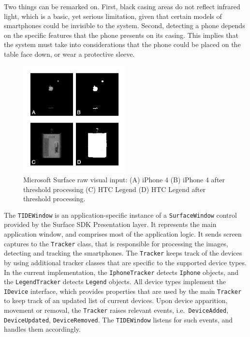 Two things can be remarked on.
First, black casing areas do not reflect infrared light, which is a basic, yet serious limitation, given that certain models of smartphones could be invisible to the system.
Second, detecting a phone depends on the specific features that the phone presents on its casing.
This implies that the system must take into considerations that the phone could be placed on the table face down, or wear a protective sleeve.

\begin{figure}[htbp]
  \centering
    \includegraphics[width=0.5\textwidth]{images/msRaw}
    \caption{Microsoft Surface raw visual input: (A) iPhone 4 (B) iPhone 4 after threshold processing (C) HTC Legend (D) HTC Legend after threshold processing.}
    \label{fig:msRaw}
\end{figure}

The \texttt{TIDEWindow} is an application-specific instance of a \texttt{SurfaceWindow} control provided by the Surface SDK Presentation layer. 
It represents the main application window, and comprises most of the application logic.
It sends screen captures to the \texttt{Tracker} class, that is responsible for processing the images, detecting and tracking the smartphones.
The \texttt{Tracker} keeps track of the devices by using additional tracker classes that are specific to the supported device types.
In the current implementation, the \texttt{IphoneTracker} detects \texttt{Iphone} objects, and the \texttt{LegendTracker} detects \texttt{Legend} objects.
All device types implement the \texttt{IDevice} interface, which provides properties that are used by the main \texttt{Tracker} to keep track of an updated list of current devices.
Upon device apparition, movement or removal, the \texttt{Tracker} raises relevant events, i.e.\ \texttt{DeviceAdded}, \texttt{DeviceUpdated}, \texttt{DeviceRemoved}.
The \texttt{TIDEWindow} listens for such events, and handles them accordingly.

